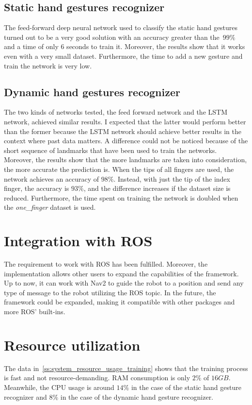 \documentclass[../thesis.tex]{subfiles}
\begin{document}
\subsection{Static hand gestures recognizer}
The feed-forward deep neural network used to classify the static hand gestures turned out to be a very good solution with an accuracy greater than the $99\%$ and a time of only $6$ seconds to train it. Moreover, the results show that it works even with a very small dataset. Furthermore, the time to add a new gesture and train the network is very low.

\subsection{Dynamic hand gestures recognizer}
The two kinds of networks tested, the feed forward network and the \acrshort{LSTM} network, achieved similar results. I expected that the latter would perform better than the former because the \acrshort{LSTM} network should achieve better results in the context where past data matters. A difference could not be noticed because of the short sequence of landmarks that have been used to train the networks.\\

Moreover, the results show that the more landmarks are taken into consideration, the more accurate the prediction is. When the tips of all fingers are used, the network achieves an accuracy of $98\%$. Instead, with just the tip of the index finger, the accuracy is $93\%$, and the difference increases if the dataset size is reduced. Furthermore, the time spent on training the network is doubled when the \textit{one\_finger} dataset is used.

\section{Integration with ROS}
The requirement to work with \acrshort{ROS} has been fulfilled. Moreover, the implementation allows other users to expand the capabilities of the framework. Up to now, it can work with Nav2 to guide the robot to a position and send any type of message to the robot utilizing the \acrshort{ROS} topic. In the future, the framework could be expanded, making it compatible with other packages and more \acrshort{ROS}' built-ins.

\section{Resource utilization}
The data in~\ref{ss:system_resource_usage_training} shows that the training process is fast and not resource-demanding. RAM consumption is only $2\%$ of $16GB$. Meanwhile, the CPU usage is around $14\%$ in the case of the static hand gesture recognizer and $8\%$ in the case of the dynamic hand gesture recognizer.\\
\end{document}
